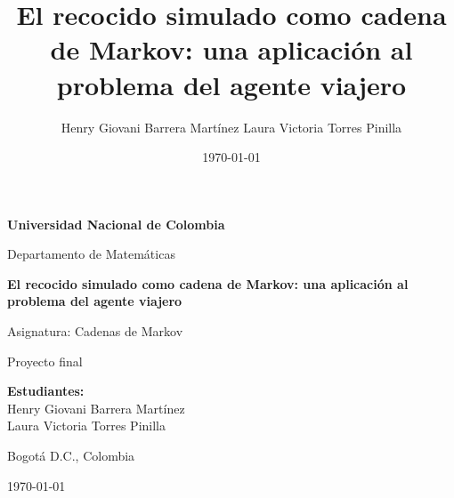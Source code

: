 \documentclass[12pt,a4paper]{article}
\title{
    \textbf{El recocido simulado como cadena de Markov: una aplicación al problema del agente viajero}
}
\author{
    Henry Giovani Barrera Martínez
    Laura Victoria Torres Pinilla
}
\date{\today}
\theoremstyle{definition}
\theoremstyle{plain}
\begin{document}
\begin{titlepage}

    \centering

    \vspace*{2cm}

    {\Large \textbf{Universidad Nacional de Colombia}\par}

    \vspace{0.5cm}

    {\large Departamento de Matemáticas\par}

    \vspace{2cm}

    {\LARGE
    \textbf{El recocido simulado como cadena de Markov: una aplicación al problema del agente viajero}
    \par}

    \vspace{1.5cm}

    {\large Asignatura: Cadenas de Markov\par}

    {\large Proyecto final\par}

    \vspace{2cm}

    {\large
    \textbf{Estudiantes:}\\
        Henry Giovani Barrera Martínez\\
        Laura Victoria Torres Pinilla
    \par}

    \vfill

    {\large Bogotá D.C., Colombia\par}

    {\large \today\par}

\end{titlepage}



\tableofcontents

\newpage










\end{document}
